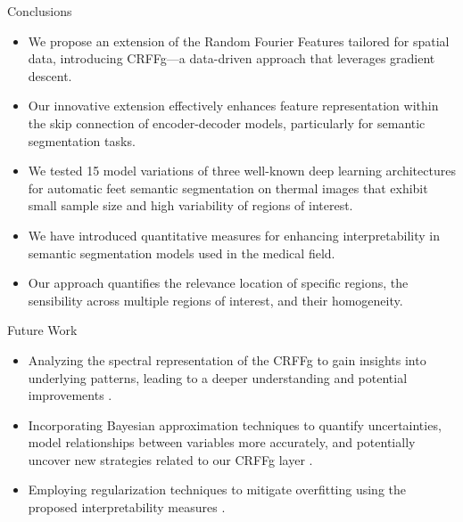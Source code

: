 \documentclass[aspectratio=169]{beamer}
\let\oldcite\cite %
\renewcommand{\cite}[1]{{\tiny\oldcite{#1}}}
\begin{document}
\begin{frame}{Conclusions}

\begin{itemize}
    \setlength\itemsep{1em}

        \item We propose an extension of the Random Fourier Features tailored for spatial data, introducing CRFFg—a data-driven approach that leverages gradient descent. 
        
        \item Our innovative extension effectively enhances feature representation within the skip connection of encoder-decoder models, particularly for semantic segmentation tasks. 
    
    \item We tested 15 model variations of three well-known  deep learning architectures for automatic feet semantic segmentation on thermal images that exhibit small sample size and high variability of regions of interest.
    


    \item We have introduced quantitative measures for enhancing interpretability in semantic segmentation models used in the medical field. 
    
    \item Our approach quantifies the relevance location of specific regions, the sensibility across multiple regions of interest, and their homogeneity.
\end{itemize}


\end{frame}

\begin{frame}{Future Work}

\begin{itemize}
    \setlength\itemsep{1em}
    \item Analyzing the spectral representation of the CRFFg to gain insights into underlying patterns, leading to a deeper understanding and potential improvements \cite{ZHANG202041}.
    
    \item Incorporating Bayesian approximation techniques to quantify uncertainties, model relationships between variables more accurately, and potentially uncover new strategies related to our CRFFg layer \cite{MILLER2022100598}.
    
    \item Employing regularization techniques to mitigate overfitting using the proposed interpretability measures \cite{chang2020mixupcam, 9506582}.
\end{itemize}



\end{frame}
\end{document}
